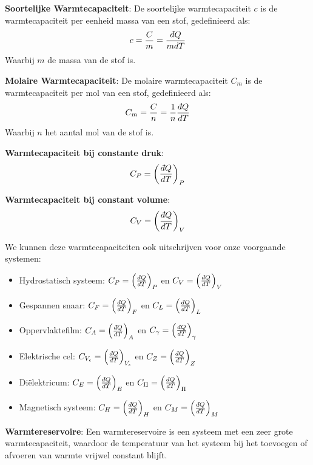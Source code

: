 \begin{definition}
    \textbf{Soortelijke Warmtecapaciteit}: De soortelijke warmtecapaciteit \(c\) is de warmtecapaciteit per eenheid massa van een stof, gedefinieerd als:
\[c = \frac{C}{m} = \frac{\dbar Q}{m dT}\]
Waarbij \(m\) de massa van de stof is.
\end{definition}

\begin{definition}
    \textbf{Molaire Warmtecapaciteit}: De molaire warmtecapaciteit \(C_m\) is de warmtecapaciteit per mol van een stof, gedefinieerd als:
\[C_m = \frac{C}{n} = \frac{1}{n}\frac{\dbar Q}{ dT}\]
Waarbij \(n\) het aantal mol van de stof is.
\end{definition}

\begin{definition}
    \textbf{Warmtecapaciteit bij constante druk}:
    \[C_P = \left( \frac{\dbar Q}{dT} \right)_P\]
\end{definition}

\begin{definition}
    \textbf{Warmtecapaciteit bij constant volume}:
    \[C_V = \left( \frac{\dbar Q}{dT} \right)_V\]
\end{definition}

We kunnen deze warmtecapaciteiten ook uitschrijven voor onze voorgaande systemen:
\begin{itemize}
    \item Hydrostatisch systeem: \(C_P = \left( \frac{\dbar Q}{dT} \right)_P\) en \(C_V = \left( \frac{\dbar Q}{dT} \right)_V\)
    \item Gespannen snaar: \(C_F = \left( \frac{\dbar Q}{dT} \right)_F\) en \(C_L = \left( \frac{\dbar Q}{dT} \right)_L\)
    \item Oppervlaktefilm: \(C_A = \left( \frac{\dbar Q}{dT} \right)_A\) en \(C_\gamma = \left( \frac{\dbar Q}{dT} \right)_\gamma\)
    \item Elektrische cel: \(C_{V_\epsilon} = \left( \frac{\dbar Q}{dT} \right)_{V_\epsilon}\) en \(C_Z = \left( \frac{\dbar Q}{dT} \right)_Z\)
    \item Diëlektricum: \(C_E = \left( \frac{\dbar Q}{dT} \right)_E\) en \(C_\Pi = \left( \frac{\dbar Q}{dT} \right)_\Pi\)
    \item Magnetisch systeem: \(C_H = \left( \frac{\dbar Q}{dT} \right)_H\) en \(C_M = \left( \frac{\dbar Q}{dT} \right)_M\)
\end{itemize}

\begin{definition}
    \textbf{Warmtereservoire}: Een warmtereservoire is een systeem met een zeer grote warmtecapaciteit, waardoor de temperatuur van het systeem bij het toevoegen of afvoeren van warmte vrijwel constant blijft.
\end{definition}

